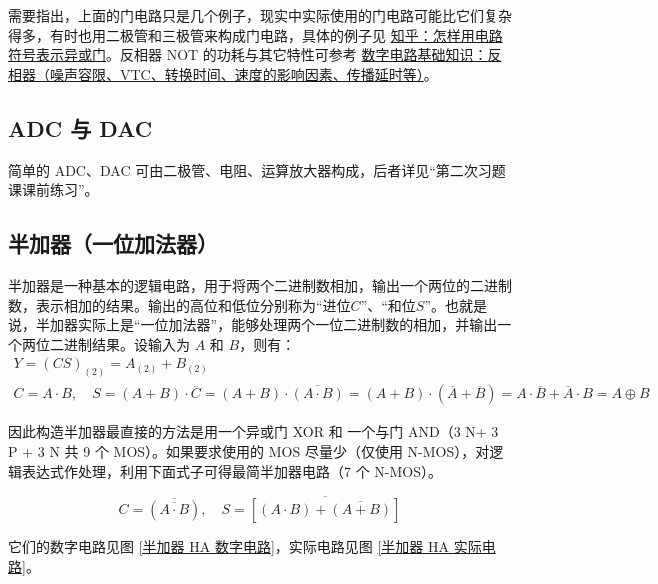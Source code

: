 \documentclass[UTF8]{report}
\theoremstyle{MyLineTheoremStyle} %
\theoremstyle{MyBlockTheoremStyle} %
\theoremstyle{MySubsubsectionStyle} %
\begin{document}
需要指出，上面的门电路只是几个例子，现实中实际使用的门电路可能比它们复杂得多，有时也用二极管和三极管来构成门电路，具体的例子见 \href{https://www.zhihu.com/question/36577129/answer/68096454}{知乎：怎样用电路符号表示异或门}。反相器 NOT 的功耗与其它特性可参考 \href{https://blog.csdn.net/vivid117/article/details/100083567}{数字电路基础知识：反相器（噪声容限、VTC、转换时间、速度的影响因素、传播延时等）}。

\subsection{ADC 与 DAC}


简单的 ADC、DAC 可由二极管、电阻、运算放大器构成，后者详见“第二次习题课课前练习”。

\subsection{半加器（一位加法器）}

半加器是一种基本的逻辑电路，用于将两个二进制数相加，输出一个两位的二进制数，表示相加的结果。输出的高位和低位分别称为“进位$C$”、“和位$S$”。也就是说，半加器实际上是“一位加法器”，能够处理两个一位二进制数的相加，并输出一个两位二进制结果。设输入为 $A$ 和 $B$，则有：
\begin{gather}
Y = (C S)_{(2)} = A_{(2)} + B_{(2)}
\\
C = A \cdot B,\quad S = (A + B)\cdot \overline{C} = (A + B)\cdot \overline{(A \cdot B)} = (A + B)\cdot (\overline{A} + \overline{B})  = A\cdot \overline{B}  + \overline{A}\cdot B =  A \oplus B
\end{gather}

因此构造半加器最直接的方法是用一个异或门  XOR  和 一个与门 AND（3 N+ 3 P + 3 N 共 9 个 MOS）。如果要求使用的 MOS 尽量少（仅使用 N-MOS），对逻辑表达式作处理，利用下面式子可得最简半加器电路（7 个 N-MOS）。

\begin{equation}
    C = \overline{(\overline{A\cdot B})},\quad S = \overline{\left[(A \cdot B) + \overline{(A + B)}\right]}
\end{equation}

它们的数字电路见图 \ref{半加器 HA 数字电路}，实际电路见图 \ref{半加器 HA 实际电路}。
\end{document}
